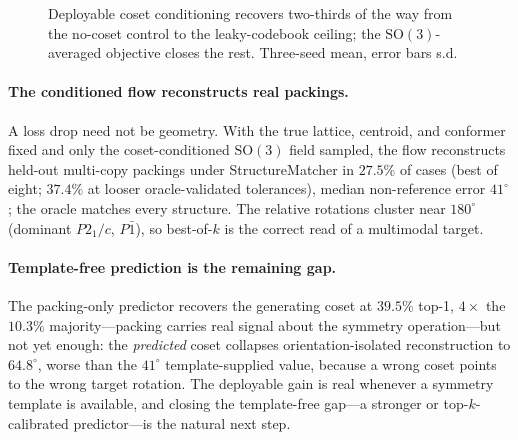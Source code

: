 \documentclass[10pt]{article}
\begin{document}
\begin{figure}[t]
\centering
{}
\caption{Deployable coset conditioning recovers two-thirds of the way from the
no-coset control to the leaky-codebook ceiling; the $\mathrm{SO}(3)$-averaged
objective closes the rest. Three-seed mean, error bars s.d.}
\label{fig:gate}
\end{figure}

\paragraph{The conditioned flow reconstructs real packings.}
A loss drop need not be geometry. With the true lattice, centroid, and conformer
fixed and only the coset-conditioned $\mathrm{SO}(3)$ field sampled, the flow
reconstructs held-out multi-copy packings under StructureMatcher in $27.5\%$ of
cases (best of eight; $37.4\%$ at looser oracle-validated tolerances), median
non-reference error $41^\circ$; the oracle matches every structure. The relative
rotations cluster near $180^\circ$ (dominant $P2_1/c$, $P\bar1$), so best-of-$k$ is
the correct read of a multimodal target.

\paragraph{Template-free prediction is the remaining gap.}
The packing-only predictor recovers the generating coset at $39.5\%$ top-1,
$4\times$ the $10.3\%$ majority---packing carries real signal about the symmetry
operation---but not yet enough: the \emph{predicted} coset collapses
orientation-isolated reconstruction to $64.8^\circ$, worse than the $41^\circ$
template-supplied value, because a wrong coset points to the wrong target rotation.
The deployable gain is real whenever a symmetry template is available, and closing
the template-free gap---a stronger or top-$k$-calibrated predictor---is the natural
next step.
\end{document}
